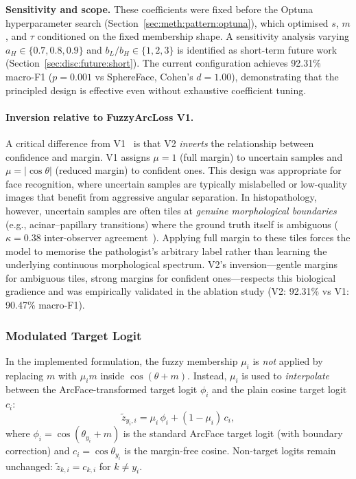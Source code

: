 \textbf{Sensitivity and scope.}
These coefficients were fixed before the Optuna hyperparameter
search (Section~\ref{sec:meth:pattern:optuna}), which optimised
$s$, $m$, and $\tau$ conditioned on the fixed membership shape.
A sensitivity analysis varying $a_H \in \{0.7, 0.8, 0.9\}$ and
$b_L / b_H \in \{1, 2, 3\}$ is identified as short-term future
work (Section~\ref{sec:disc:future:short}).
The current configuration achieves 92.31\% macro-F1
($p = 0.001$ vs SphereFace, Cohen's $d = 1.00$), demonstrating
that the principled design is effective even without exhaustive
coefficient tuning.

\paragraph{Inversion relative to FuzzyArcLoss V1.}
A critical difference from V1~\cite{lima2025fuzzy} is that V2
\emph{inverts} the relationship between confidence and margin.
V1 assigns $\mu = 1$ (full margin) to uncertain samples and
$\mu = |\cos\theta|$ (reduced margin) to confident ones.
This design was appropriate for face recognition, where uncertain
samples are typically mislabelled or low-quality images that
benefit from aggressive angular separation.
In histopathology, however, uncertain samples are often tiles at
\emph{genuine morphological boundaries} (e.g., acinar--papillary
transitions) where the ground truth itself is ambiguous
($\kappa = 0.38$ inter-observer agreement~\cite{thunnissen2012reproducibility}).
Applying full margin to these tiles forces the model to memorise
the pathologist's arbitrary label rather than learning the
underlying continuous morphological spectrum.
V2's inversion---gentle margins for ambiguous tiles, strong
margins for confident ones---respects this biological gradience
and was empirically validated in the ablation study
(V2: 92.31\% vs V1: 90.47\% macro-F1).

\subsubsection{Modulated Target Logit}

In the implemented formulation, the fuzzy membership $\mu_i$ is
\emph{not} applied by replacing $m$ with $\mu_i m$ inside
$\cos(\theta + m)$.
Instead, $\mu_i$ is used to \emph{interpolate} between the
ArcFace-transformed target logit $\phi_i$ and the plain cosine target
logit $c_i$:
\begin{equation}
\label{eq:fuzzyarcloss_v2_method}
\tilde{z}_{y_i,i} = \mu_i \, \phi_i + (1 - \mu_i) \, c_i,
\end{equation}
where $\phi_i = \cos(\theta_{y_i} + m)$ is the standard ArcFace target
logit (with boundary correction) and $c_i = \cos\theta_{y_i}$ is the
margin-free cosine.
Non-target logits remain unchanged: $\tilde{z}_{k,i} = c_{k,i}$ for
$k \neq y_i$.

